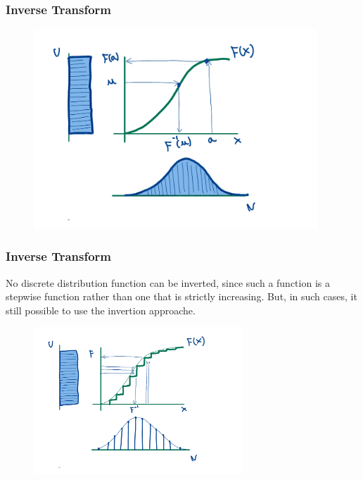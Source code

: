 \begin{frame}
    \frametitle{Inverse Transform}
    \begin{figure}
        \centering
        \includegraphics[width=0.95\textwidth]{sections/prng/figures/inverse_method_continuous.pdf}
    \end{figure}
\end{frame}


\begin{frame}
    \frametitle{Inverse Transform}
    
    No discrete distribution function can be inverted, since such a function
    is a stepwise function rather than one that is strictly increasing. But, in such cases,
    it still possible to use the invertion approache.

    \begin{figure}
        \centering
        \includegraphics[width=0.7\textwidth]{sections/prng/figures/inverse_method_discrete.pdf}
    \end{figure}


\end{frame}



